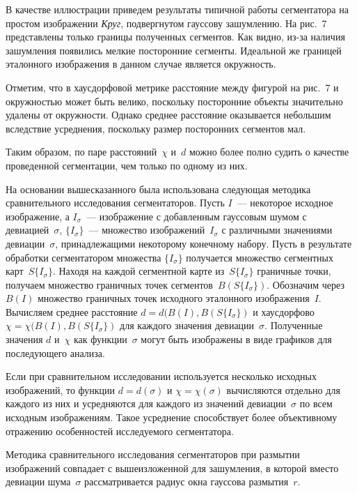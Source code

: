\begin{multicols}{2}
  В качестве иллюстрации приведем результаты типичной работы 
сегментатора на простом изображении \textit{Круг}, подвергнутом гауссову 
зашумлению. На рис.~7 представлены только границы полученных сегментов. 
Как видно, из-за наличия зашумления появились мелкие посторонние 
сегменты. Идеальной же границей эталонного изображения в данном случае 
является окружность.


  Отметим, что в хаусдорфовой метрике расстояние между фигурой на рис.~7 
и окружностью может быть велико, поскольку посторонние объекты 
значительно удалены от окружности. Однако среднее расстояние оказывается 
небольшим вследствие усреднения, поскольку размер посторонних сегментов 
мал.
  
  Таким образом, по паре расстояний~$\chi$ и~$d$ можно более полно судить 
о качестве проведенной сегментации, чем только по одному из них.
  
  На основании вышесказанного была использована следующая методика 
сравнительного исследования сегментаторов. Пусть $I$~--- некоторое исход\-ное 
изображение, а $I_\sigma$~--- изображение с до\-бав\-лен\-ным гауссовым шумом с 
девиацией~$\sigma$, $\{I_\sigma\}$~--- множество изображений~$I_\sigma$ с 
различными значениями девиации~$\sigma$, принадлежащими некоторому 
конечному набору. Пусть в результате обработки сегментатором множества 
$\{I_\sigma\}$ получается множество сегментных карт~$S\{I_\sigma\}$. Находя 
на каждой сегментной карте из~$S\{I_\sigma\}$ граничные точки, получаем 
множество граничных точек сегментов~$B(S\{I_\sigma\})$. Обозначим через 
$B(I)$ множество граничных точек исходного эталонного изображения~$I$. 
Вычисляем среднее расстояние $d = d(B(I), B(S\{I_\sigma\})$ и хаусдорфово 
$\chi = \chi(B(I), B(S\{I_\sigma\})$ для каждого значения девиации~$\sigma$. 
Полученные значения $d$ и~$\chi$ как функции~$\sigma$ могут быть 
изображены в виде графиков для последующего анализа.
  
  Если при сравнительном исследовании используется несколько исходных 
изображений, то функции $d = d(\sigma)$ и $\chi = \chi(\sigma)$ вычисляются 
отдельно для каждого из них и усредняются для каждого из значений 
девиации~$\sigma$ по всем исходным изображениям. Такое усреднение 
способствует более объективному отражению особенностей исследуемого 
сегментатора.
  
  Методика сравнительного исследования сегментаторов при размытии 
изображений совпадает с вышеизложенной для зашумления, в которой вмес\-то 
девиации шума~$\sigma$ рассматривается радиус окна гауссова размытия~$r$.



\end{multicols}
